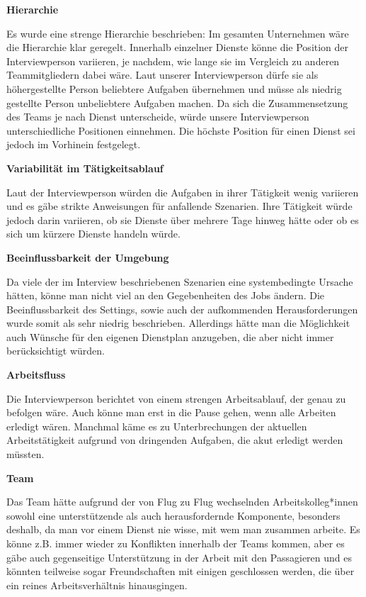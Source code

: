 \documentclass[12pt, a4paper]{article}
\begin{document}
\textbf{Hierarchie}

Es wurde eine strenge Hierarchie beschrieben: Im gesamten Unternehmen wäre die Hierarchie klar geregelt.
Innerhalb einzelner Dienste könne die Position der Interviewperson variieren, je nachdem, wie lange sie im Vergleich zu anderen
Teammitgliedern dabei wäre. Laut unserer Interviewperson dürfe sie als höhergestellte Person beliebtere Aufgaben übernehmen und müsse als 
niedrig gestellte Person unbeliebtere Aufgaben machen. Da sich die Zusammensetzung des Teams je nach Dienst unterscheide, 
würde unsere Interviewperson unterschiedliche Positionen einnehmen. Die höchste Position für einen Dienst sei jedoch im Vorhinein festgelegt. 

\textbf{Variabilität im Tätigkeitsablauf}

Laut der Interviewperson würden die Aufgaben in ihrer Tätigkeit wenig variieren und es gäbe strikte Anweisungen für anfallende Szenarien.
Ihre Tätigkeit würde jedoch darin variieren, ob sie Dienste über mehrere Tage hinweg hätte oder ob es sich um kürzere Dienste handeln würde. 

\textbf{Beeinflussbarkeit der Umgebung}

Da viele der im Interview beschriebenen Szenarien eine systembedingte Ursache hätten, könne man nicht viel an den Gegebenheiten des Jobs ändern.
Die Beeinflussbarkeit des Settings, sowie auch der aufkommenden Herausforderungen wurde somit als sehr niedrig beschrieben. 
Allerdings hätte man die Möglichkeit auch Wünsche für den eigenen Dienstplan anzugeben, die aber nicht immer berücksichtigt würden.

\textbf{Arbeitsfluss}

Die Interviewperson berichtet von einem strengen Arbeitsablauf, der genau zu befolgen wäre.
Auch könne man erst in die Pause gehen, wenn alle Arbeiten erledigt wären. 
Manchmal käme es zu Unterbrechungen der aktuellen Arbeitstätigkeit aufgrund von dringenden Aufgaben, die akut erledigt werden müssten.

\textbf{Team}

Das Team hätte aufgrund der von Flug zu Flug wechselnden Arbeitskolleg*innen sowohl eine unterstützende als auch herausfordernde Komponente, 
besonders deshalb, da man vor einem Dienst nie wisse, mit wem man zusammen arbeite.
Es könne z.B. immer wieder zu Konflikten innerhalb der Teams kommen, aber es gäbe auch gegenseitige 
Unterstützung in der Arbeit mit den Passagieren und es könnten teilweise sogar Freundschaften mit einigen geschlossen werden, die über ein reines Arbeitsverhältnis hinausgingen.
\end{document}
